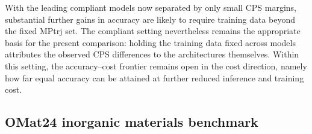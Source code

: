 With the leading compliant models now separated by only small CPS margins, substantial further gains in accuracy are likely to require training data beyond the fixed MPtrj set.
The compliant setting nevertheless remains the appropriate basis for the present comparison: holding the training data fixed across models attributes the observed CPS differences to the architectures themselves.
Within this setting, the accuracy--cost frontier remains open in the cost direction, namely how far equal accuracy can be attained at further reduced inference and training cost.

\subsection{OMat24 inorganic materials benchmark}
\label{sec:omat24}

